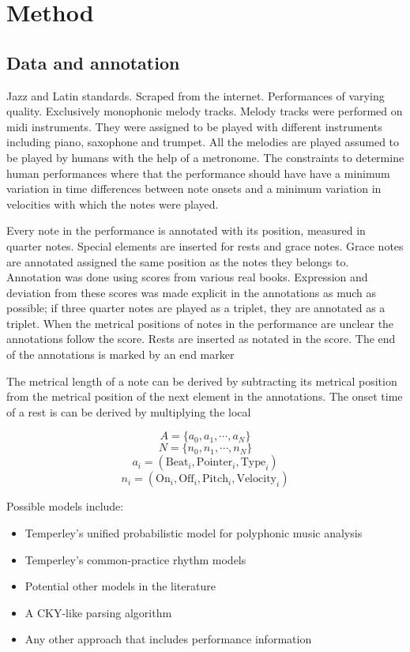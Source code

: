\section{Method}
\label{sec:method}

\subsection{Data and annotation}

Jazz and Latin standards. Scraped from the internet. Performances of varying quality. Exclusively monophonic melody tracks. Melody tracks were performed on midi instruments. They were assigned to be played with different instruments including piano, saxophone and trumpet. All the melodies are played assumed to be played by humans with the help of a metronome. The constraints to determine human performances where that the performance should have have a minimum variation in time differences between note onsets and a minimum variation in velocities with which the notes were played.

Every note in the performance is annotated with its position, measured in quarter notes. Special elements are inserted for rests and grace notes. Grace notes are annotated assigned the same position as the notes they belongs to. Annotation was done using scores from various real books. Expression and deviation from these scores was made explicit in the annotations as much as possible; if three quarter notes are played as a triplet, they are annotated as a triplet. When the metrical positions of notes in the performance are unclear the annotations follow the score. Rests are inserted as notated in the score. The end of the annotations is marked by an end marker

The metrical length of a note can be derived by subtracting its metrical position from the metrical position of the next element in the annotations. The onset time of a rest is can be derived by multiplying the local 

\[A = \{a_0, a_1, \cdots, a_N\}\]
\[N = \{n_0, n_1, \cdots, n_N\}\]
\[a_i = (\mathrm{Beat}_i, \mathrm{Pointer}_i, \mathrm{Type}_i)\]
\[n_i = (\mathrm{On}_i, \mathrm{Off}_i, \mathrm{Pitch}_i, \mathrm{Velocity}_i)\]


Possible models include:
\begin{itemize}
\item Temperley's unified probabilistic model for polyphonic music analysis
\item Temperley's common-practice rhythm models
\item Potential other models in the literature
\item A CKY-like parsing algorithm 
\item Any other approach that includes performance information
\end{itemize}

